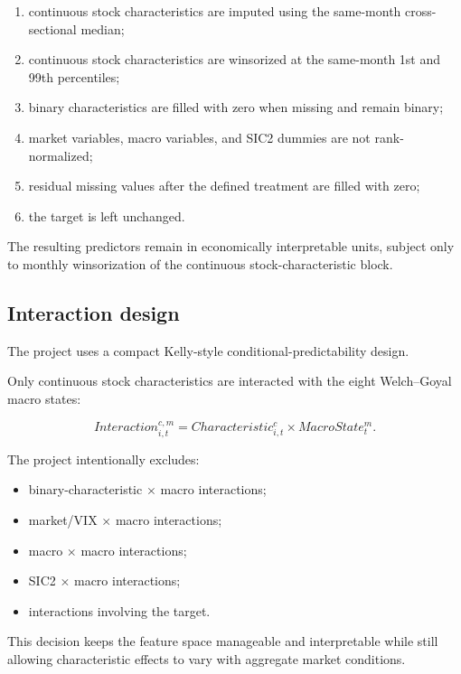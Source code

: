 \documentclass[11pt,a4paper]{article}
\begin{document}
\begin{enumerate}
  \item continuous stock characteristics are imputed using the same-month
        cross-sectional median;
  \item continuous stock characteristics are winsorized at the same-month 1st
        and 99th percentiles;
  \item binary characteristics are filled with zero when missing and remain
        binary;
  \item market variables, macro variables, and SIC2 dummies are not
        rank-normalized;
  \item residual missing values after the defined treatment are filled with
        zero;
  \item the target is left unchanged.
\end{enumerate}

The resulting predictors remain in economically interpretable units, subject
only to monthly winsorization of the continuous stock-characteristic block.

\subsection{Interaction design}

The project uses a compact Kelly-style conditional-predictability design.

Only continuous stock characteristics are interacted with the eight
Welch--Goyal macro states:

\[
  Interaction_{i,t}^{c,m}
  =
  Characteristic_{i,t}^{c}
  \times
  MacroState_t^{m}.
\]

The project intentionally excludes:

\begin{itemize}
  \item binary-characteristic \(\times\) macro interactions;
  \item market/VIX \(\times\) macro interactions;
  \item macro \(\times\) macro interactions;
  \item SIC2 \(\times\) macro interactions;
  \item interactions involving the target.
\end{itemize}

This decision keeps the feature space manageable and interpretable while still
allowing characteristic effects to vary with aggregate market conditions.

\end{document}
